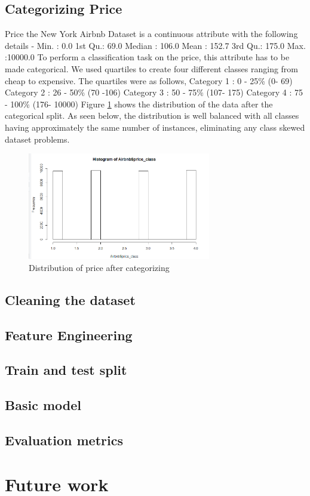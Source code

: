 \documentclass{sig-alternate}
\begin{document}
	\subsection{Categorizing Price}
	Price the New York Airbnb Dataset is a continuous attribute with the following details - \newline
	 Min.   :    0.0  \newline
	1st Qu.:   69.0  \newline
	Median :  106.0  \newline
	Mean   :  152.7  \newline
	3rd Qu.:  175.0  \newline
	Max.   :10000.0  \newline
	To perform a classification task on the price, this attribute has to be made categorical. We used quartiles to create four different classes ranging from cheap to expensive. The quartiles were as follows,
	Category 1 : 0 - 25\% (0- 69) \newline
	Category 2 : 26 - 50\% (70 -106) \newline
	Category 3 : 50 - 75\% (107- 175) \newline
	Category 4 : 75 - 100\% (176- 10000) \newline
	Figure \ref{dist} shows the distribution of the data after the categorical split. As seen below, the distribution is well balanced with all classes having approximately the same number of instances, eliminating any class skewed dataset problems.
	\begin{figure}[ht]
		\includegraphics[width=8cm]{dist.png}
		\caption{Distribution of price after categorizing}
		\label{dist}
		\centering
	\end{figure}
	\subsection{Cleaning the dataset}
	\subsection{Feature Engineering} 
	\subsection{Train and test split}
	\subsection{Basic model}
	\subsection{Evaluation metrics}
	\section{Future work} 
	
	
\end{document}
